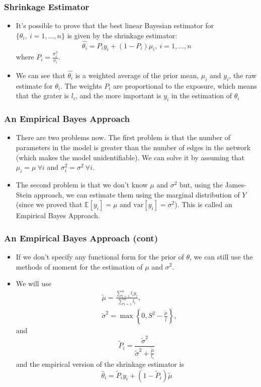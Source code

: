 \documentclass[c,10pt,pdftex]{beamer}
\begin{document}
\begin{frame}
\frametitle{Shrinkage Estimator}
\vspace{-0.75cm}
\begin{itemize}
	\setlength\itemsep{1em}
	\item It's possible to prove that the best linear Bayesian estimator for $\lbrace \theta_{i}, \ i = 1, \dots, n \rbrace$ is given by the \alert{shrinkage estimator}:
	\[
	\hat{\theta_i} = P_iy_i + (1 - P_i)\mu_i, \ i = 1, \dots, n
	\]
	where $P_i = \frac{\sigma^2_i}{\nu_i}$. 
	
	\item We can see that $\hat{\theta_i}$ is a weighted average of the prior mean, $\mu_i$ and $y_i$, the raw estimate for $\theta_{i}$. The weights $P_i$ are proportional to the exposure, which means that the grater is $l_i$, and the more important is $y_i$ in the estimation of $\theta_i$ 
\end{itemize}
\end{frame}

\begin{frame}
\frametitle{An Empirical Bayes Approach}
\vspace{-0.75cm}
\begin{itemize}
	\setlength\itemsep{1em}
	\item There are two problems now. The first problem is that the number of parameters in the model is greater than the number of edges in the network (which makes the model unidentifiable). We can solve it by assuming that $\mu_i = \mu \ \forall i$ and $\sigma^2_i = \sigma^2 \ \forall i$. 
	
	\item The second problem is that we don't know $\mu$ and $\sigma^2$ but, using the James-Stein approach, we can estimate them using the marginal distribution of $Y$ (since we proved that $\mathbb{E}[y_i] = \mu$ and $\text{var}[y_i] = \sigma^2$). This is called an Empirical Bayes Approach. 
\end{itemize}
\end{frame}

\begin{frame}
\frametitle{An Empirical Bayes Approach (cont)}
\vspace{-0.75cm}
\begin{itemize}
	\setlength\itemsep{1em}
	\item If we don't specify any functional form for the prior of $\theta$, we can still use the methods of moment for the estimation of $\mu$ and $\sigma^2$. 
	
	\item We will use
	\[
	\begin{split}
		& \tilde{\mu} = \frac{\sum_{i=1}^{n} l_iy_i}{\sum_{i=1}^n l_i}, \\
		& \tilde{\sigma}^2 = \max\left\lbrace 0, S^2 - \frac{\tilde{\mu}}{\bar{l}}\right\rbrace,
	\end{split}
	\]
	and
	\[
	\tilde{P}_i = \frac{\tilde{\sigma}^2}{\tilde{\sigma}^2 + \frac{\tilde{\mu}}{l_i}} 
	\]
	and the empirical version of the shrinkage estimator is
	\[
	\hat{\theta}_i = \tilde{P}_iy_i + (1 - \tilde{P}_i)\tilde{\mu}
	\]
\end{itemize}
\end{frame}
\end{document}
